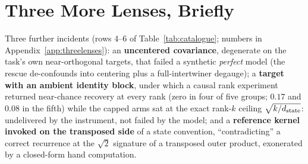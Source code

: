 \section{Three More Lenses, Briefly}
\label{sec:threelenses}

 Three further incidents (rows 4--6 of Table~\ref{tab:catalogue};
numbers in Appendix~\ref{app:threelenses}): an
\textbf{uncentered covariance}, degenerate on the task's own
near-orthogonal targets, that failed a synthetic \emph{perfect} model
(the rescue de-confounds into centering plus a full-intertwiner
degauge);
a \textbf{target with an ambient identity block}, under which a
causal rank experiment returned near-chance
recovery at every rank (zero in four of five groups; $0.17$ and
$0.08$ in the fifth) while the capped arms sat at the exact rank-$k$
ceiling $\sqrt{k/d_{\mathrm{state}}}$: undelivered by the
instrument, not failed by the model;
and a \textbf{reference kernel invoked on the transposed side} of a
state convention, ``contradicting'' a correct recurrence at the
$\sqrt{2}$ signature of a transposed outer product, exonerated by a
closed-form hand computation.
